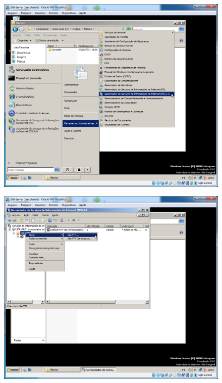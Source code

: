\documentclass[10pt]{article}
\begin{document}
\begin{figure}[H]
    \centering
    \caption{}
    \label{fig:5419}
    \includegraphics[width=\linewidth]{images/windows_server/ftp/016.png}
\end{figure}
\begin{figure}[H]
    \centering
    \caption{}
    \label{fig:54110}
    \includegraphics[width=\linewidth]{images/windows_server/ftp/017.png}
\end{figure}
\end{document}
